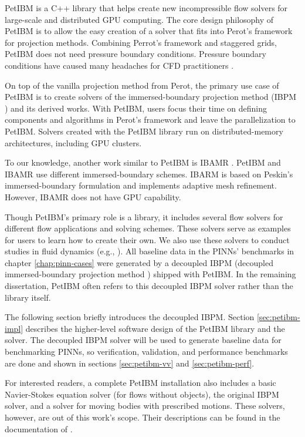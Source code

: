 PetIBM is a C++ library that helps create new incompressible flow solvers for large-scale and distributed GPU computing.
The core design philosophy of PetIBM is to allow the easy creation of a solver that fits into Perot's framework \cite{perot_analysis_1993} for projection methods.
Combining Perrot's framework and staggered grids, PetIBM does not need pressure boundary conditions.
Pressure boundary conditions have caused many headaches for CFD practitioners \cite{gresho_pressure_1987,sani_resume_1994}.

On top of the vanilla projection method from Perot, the primary use case of PetIBM is to create solvers of the immersed-boundary projection method (IBPM \cite{taira_immersed_2007}) and its derived works.
With PetIBM, users focus their time on defining components and algorithms in Perot's framework and leave the parallelization to PetIBM.
Solvers created with the PetIBM library run on distributed-memory architectures, including GPU clusters.

To our knowledge, another work similar to PetIBM is IBAMR \cite{griffith_adaptive_2007,bhalla_unified_2013}. 
PetIBM and IBAMR use different immersed-boundary schemes.
IBARM is based on Peskin's immersed-boundary formulation \cite{Peskin2002} and implements adaptive mesh refinement.
However, IBAMR does not have GPU capability.

Though PetIBM's primary role is a library, it includes several flow solvers for different flow applications and solving schemes.
These solvers serve as examples for users to learn how to create their own.
We also use these solvers to conduct studies in fluid dynamics (e.g., \cite{mesnard_reproducible_2017}).
All baseline data in the PINNs' benchmarks in chapter \ref{chap:pinn-cases} were generated by a decoupled IBPM (decoupled immersed-boundary projection method \cite{li_efficient_2016}) shipped with PetIBM.
In the remaining dissertation, PetIBM often refers to this decoupled IBPM solver rather than the library itself.

The following section briefly introduces the decoupled IBPM.
Section \ref{sec:petibm-impl} describes the higher-level software design of the PetIBM library and the solver.
The decoupled IBPM solver will be used to generate baseline data for benchmarking PINNs, so verification, validation, and performance benchmarks are done and shown in sections \ref{sec:petibm-vv} and \ref{sec:petibm-perf}.

For interested readers, a complete PetIBM installation also includes a basic Navier-Stokes equation solver (for flows without objects), the original IBPM solver, and a solver for moving bodies with prescribed motions.
These solvers, however, are out of this work's scope.
Their descriptions can be found in the documentation of \cite{chuang_petibm:_2018}.
